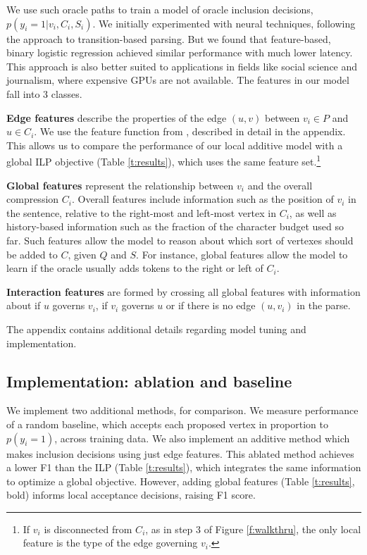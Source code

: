 \documentclass[11pt,a4paper]{article}
\begin{document}
We use such oracle paths to train a model of oracle inclusion decisions, ${p(y_i  = 1 | v_i, C_i, S_i)}$. We initially experimented with neural techniques, following the \citet{D14-1082} approach to transition-based parsing. But we found that feature-based, binary logistic regression achieved similar performance with much lower latency. This approach is also better suited to applications in fields like social science and journalism, where expensive GPUs are not available. The features in our model fall into 3 classes.

\textbf{Edge features} describe the properties of the edge $(u,v)$ between $v_i \in P$ and $u \in C_i$. We use the feature function from \citet{filippova2013overcoming}, described in detail in the appendix. This allows us to compare the performance of our local additive model with a global ILP objective (Table \ref{t:results}), which uses the same feature set.\footnote{If $v_i$ is disconnected from $C_i$, as in step 3 of Figure \ref{f:walkthru}, the only local feature is the type of the edge governing $v_i$.}

\textbf{Global features} represent the relationship between $v_i$ and the overall compression $C_i$. Overall features include information such as the position of $v_i$ in the sentence, relative to the right-most and left-most vertex in $C_i$, as well as history-based information such as the fraction of the character budget used so far. Such features allow the model to reason about which sort of vertexes should be added to $C$, given $Q$ and $S$. For instance, global features allow the model to learn if the oracle usually adds tokens to the right or left of $C_i$.

\textbf{Interaction features} are formed by crossing all global features with information about if $u$ governs $v_i$, if $v_i$ governs $u$ or if there is no edge $(u,v_i)$ in the parse.

The appendix contains additional details regarding model tuning and implementation. 

\subsection{Implementation: ablation and baseline}
We implement two additional methods, for comparison. We measure performance of a random baseline, which accepts each proposed vertex in proportion to $p(y_i = 1)$, across training data. We also implement an additive method which makes inclusion decisions using just edge features. This ablated method achieves a lower F1 than the ILP (Table \ref{t:results}), which integrates the same information to optimize a global objective. However, adding global features (Table \ref{t:results}, bold) informs local acceptance decisions, raising F1 score. 
\end{document}
